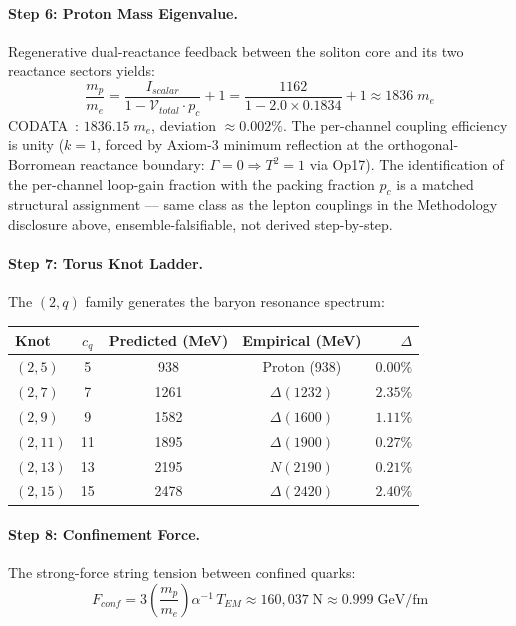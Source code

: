 \paragraph{Step 6: Proton Mass Eigenvalue.}
Regenerative dual-reactance feedback between the soliton core and its two
reactance sectors yields:
\begin{equation}
    \frac{m_p}{m_e}
    = \frac{I_{scalar}}{1 - \mathcal{V}_{total} \cdot p_c} + 1
    = \frac{1162}{1 - 2.0 \times 0.1834} + 1
    \approx \boxed{1836\;m_e}
    \label{eq:proton}
\end{equation}
CODATA~\cite{codata2018}: $1836.15\;m_e$, deviation $\approx 0.002\%$. The
per-channel coupling efficiency is unity ($k=1$, forced by Axiom-3 minimum
reflection at the orthogonal-Borromean reactance boundary: $\Gamma=0 \Rightarrow
T^2 = 1$ via Op17). The identification of the per-channel loop-gain fraction with
the packing fraction $p_c$ is a matched structural assignment --- same class as
the lepton couplings in the Methodology disclosure above, ensemble-falsifiable,
not derived step-by-step.

\paragraph{Step 7: Torus Knot Ladder.}
The $(2,q)$ family generates the baryon resonance spectrum:

\begin{center}
\begin{tabular}{lcccr}
    \toprule
    \textbf{Knot} & \textbf{$c_q$} & \textbf{Predicted (MeV)}
    & \textbf{Empirical (MeV)} & \textbf{$\Delta$} \\
    \midrule
    $(2,5)$  & 5  & 938  & Proton (938)   & $0.00\%$ \\
    $(2,7)$  & 7  & 1261 & $\Delta(1232)$ & $2.35\%$ \\
    $(2,9)$  & 9  & 1582 & $\Delta(1600)$ & $1.11\%$ \\
    $(2,11)$ & 11 & 1895 & $\Delta(1900)$ & $0.27\%$ \\
    $(2,13)$ & 13 & 2195 & $N(2190)$      & $0.21\%$ \\
    $(2,15)$ & 15 & 2478 & $\Delta(2420)$ & $2.40\%$ \\
    \bottomrule
\end{tabular}
\end{center}

\paragraph{Step 8: Confinement Force.}
The strong-force string tension between confined quarks:
\begin{equation}
    F_{conf}
    = 3\!\left(\frac{m_p}{m_e}\right)\alpha^{-1}\,T_{EM}
    \approx 160{,}037\;\text{N}
    \approx 0.999\;\text{GeV/fm}
    \label{eq:confinement}
\end{equation}

